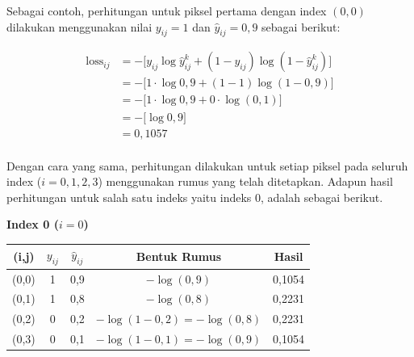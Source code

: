 Sebagai contoh, perhitungan untuk piksel pertama dengan index $(0,0)$ dilakukan menggunakan nilai $y_{ij} = 1$ dan $\hat{y}_{ij} = 0{,}9$ sebagai berikut:

\begin{align*}
	{\text{loss}_{ij}} &= -\Big[ y_{ij} \log \hat{y}^{k}_{ij} + (1 - y_{ij}) \log (1 - \hat{y}^{k}_{ij}) \Big] \\[0.5em]
	 &= -\Big[ 1 \cdot \log 0{,}9 + (1 - 1) \log (1 - 0{,}9) \Big] \\[0.5em]
	 &= -\Big[ 1 \cdot \log 0{,}9 + 0 \cdot \log (0{,}1) \Big] \\[0.5em]
	 &= -\Big[\log 0{,}9 \Big] \\[0.5em]
	 &= 0{,}1057\\[0.5em]
\end{align*}

Dengan cara yang sama, perhitungan dilakukan untuk setiap piksel pada seluruh index ($i = 0, 1, 2, 3$) menggunakan rumus yang telah ditetapkan. Adapun hasil perhitungan untuk salah satu indeks yaitu indeks 0, adalah sebagai berikut. \par

\textbf{Index 0 ($i = 0$)}
\begin{table}[H]
\centering
\renewcommand{\arraystretch}{1.3}
\label{table:3.data-index-0}
\begin{tabular}{|c|c|c|c|c|}
\hline
\textbf{(i,j)} & \textbf{$y_{ij}$} & \textbf{$\hat{y}_{ij}$} & \textbf{Bentuk Rumus} & \textbf{Hasil} \\
\hline
(0,0) & 1 & 0{,}9 & $-\log(0{,}9)$ & 0{,}1054 \\ \hline
(0,1) & 1 & 0{,}8 & $-\log(0{,}8)$ & 0{,}2231 \\ \hline
(0,2) & 0 & 0{,}2 & $-\log(1-0{,}2)=-\log(0{,}8)$ & 0{,}2231 \\ \hline
(0,3) & 0 & 0{,}1 & $-\log(1-0{,}1)=-\log(0{,}9)$ & 0{,}1054 \\
\hline
\end{tabular}
\end{table}


